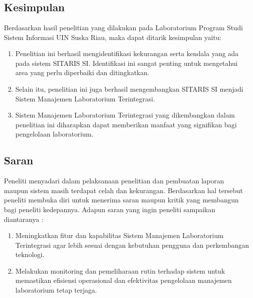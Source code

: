 %
%
%
%


\chapter{\babEnam}
\section{Kesimpulan}
Berdasarkan hasil penelitian yang dilakukan pada Laboratorium Program Studi Sistem Informasi UIN Suska Riau, maka dapat ditarik kesimpulan yaitu:

\begin{enumerate}
	\item Penelitian ini berhasil mengidentifikasi kekurangan serta kendala yang ada pada sistem SITARIS SI. Identifikasi ini sangat penting untuk mengetahui area yang perlu diperbaiki dan ditingkatkan.
	\item Selain itu, penelitian ini juga berhasil mengembangkan SITARIS SI menjadi Sistem Manajemen Laboratorium Terintegrasi.
	\item Sistem Manajemen Laboratorium Terintegrasi yang dikembangkan dalam penelitian ini diharapkan dapat memberikan manfaat yang signifikan bagi pengelolaan laboratorium.
\end{enumerate}

\section{Saran}
Peneliti menyadari dalam pelaksanaan penelitian dan pembuatan laporan maupun sistem masih terdapat celah dan kekurangan. Berdasarkan hal tersebut peneliti membuka diri untuk menerima saran maupun kritik yang membangun bagi peneliti kedepannya. Adapun saran yang ingin peneliti sampaikan diantaranya :

\begin{enumerate}
	\item Meningkatkan fitur dan kapabilitas Sistem Manajemen Laboratorium Terintegrasi agar lebih sesuai dengan kebutuhan pengguna dan perkembangan teknologi.
	\item Melakukan monitoring dan pemeliharaan rutin terhadap sistem untuk memastikan efisiensi operasional dan efektivitas pengelolaan manajemen laboratorium tetap terjaga.
\end{enumerate}